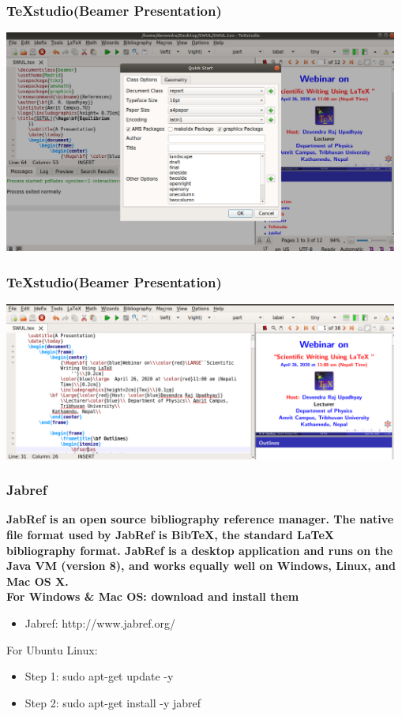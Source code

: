 \documentclass{beamer}
\begin{document}
\begin{frame}		
\frametitle{\bf TeXstudio(Beamer Presentation)}
\centering
\includegraphics[width=13cm]{TS}
\end{frame}


\begin{frame}		
\frametitle{\bf TeXstudio(Beamer Presentation)}
\centering
\includegraphics[width=13cm]{Be}
\end{frame}


			\begin{frame}		
		\frametitle{\bf Jabref}
		\bf \color{blue}JabRef is an open source bibliography reference manager. The native
		file format used by JabRef is BibTeX, the standard LaTeX bibliography
		format. JabRef is a desktop application and runs on the Java VM
		(version 8), and works equally well on Windows, Linux, and Mac OS X.\\\vspace{1cm}
		\bf
		 \color{red}For Windows \& Mac OS: \color{blue} download and install them\\
		 	\begin{itemize}
		 	
		 	\bfseries
		 	\item \color{red}Jabref: \color{blue} http://www.jabref.org/
		 		 
		 	
		 \end{itemize}
	 	\color{red} For Ubuntu Linux:
		\begin{itemize}
			
		
			\item \color{blue} Step 1: sudo apt-get update -y
			\item \color{blue} Step 2: sudo apt-get install -y jabref
			
		\end{itemize}
		
	\end{frame}
\end{document}
